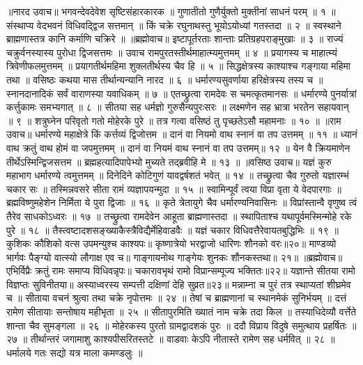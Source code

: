 ॥नारद उवाच॥
भगवन्देवदेवेश सृष्टिसंहारकारक ॥
गुणातीतो गुणैर्युक्तो मुक्तीनां साधनं परम् ॥ १ ॥
संस्थाप्य वेदभवनं विधिवद्द्विज सत्तमान् ॥
किं चक्रे रघुनाथस्तु भूयोऽयोध्यां गतस्तदा ॥ २ ॥
स्वस्थाने ब्राह्मणास्तत्र कानि कर्माणि चक्रिरे ॥
॥ब्रह्मोवाच॥
इष्टापूर्तरताः शान्ताः प्रतिग्रहपराङ्मुखाः ॥ ३ ॥
राज्यं चक्रुर्वनस्यास्य पुरोधा द्विजसत्तमः ॥
उवाच रामपुरतस्तीर्थमाहात्म्यमुत्तमम् ॥ ४ ॥
प्रयागस्य च माहात्म्यं त्रिवेणीफलमुत्तमम् ॥
प्रयागतीर्थमहिमा शुक्लतीर्थस्य चैव हि ॥ ५ ॥
सिद्धक्षेत्रस्य काश्याश्च गङ्गाया महिमा तथा ॥
वसिष्ठः कथया मास तीर्थान्यन्यानि नारद ॥ ६ ॥
धर्मारण्यसुवर्णाया हरिक्षेत्रस्य तस्य च ॥
स्नानदानादिकं सर्वं वाराणस्या यवाधिकम् ॥ ७ ॥
एतच्छ्रुत्वा रामदेवः स चमत्कृतमानसः ॥
धर्मारण्ये पुनर्यात्रां कर्त्तुकामः समभ्यगात् ॥ ८ ॥
सीतया सह धर्मज्ञो गुरुसैन्यपुरःसरः ॥
लक्ष्मणेन सह भ्रात्रा भरतेन सहायवान् ॥ ९ ॥
शत्रुघ्नेन परिवृतो गतो मोहेरके पुरे ॥
तत्र गत्वा वसिष्ठं तु पृच्छतेऽसौ महामनाः ॥ १० ॥
॥राम उवाच॥
धर्मारण्ये महाक्षेत्रे किं कर्त्तव्यं द्विजोत्तम ॥
दानं वा नियमो वाथ स्नानं वा तप उत्तमम् ॥ ११ ॥
ध्यानं वाथ क्रतुं वाथ होमं वा जपमुत्तमम् ॥
दानं वा नियमं वाथ स्नानं वा तप उत्तमम्॥ १२ ॥
येन वै क्रियमाणेन तीर्थेऽस्मिन्द्विजसत्तम ॥
ब्रह्महत्यादिपापेभ्यो मुच्यते तद्ब्रवीहि मे ॥ १३ ॥
॥वसिष्ठ उवाच॥
यज्ञं कुरु महाभाग धर्मारण्ये त्वमुत्तमम् ॥
दिनेदिने कोटिगुणं यावद्वर्षशतं भवेत् ॥ १४ ॥
तच्छ्रुत्वा चैव गुरुतो यज्ञारम्भं चकार सः ॥
तस्मिन्नवसरे सीता रामं व्यज्ञापयन्मुदा ॥ १५ ॥
स्वामिन्पूर्वं त्वया विप्रा वृता ये वेदपारगाः ॥
ब्रह्मविष्णुमहेशेन निर्मिता ये पुरा द्विजाः ॥ १६ ॥
कृते त्रेतायुगे चैव धर्मारण्यनिवासिनः ॥
विप्रांस्तान्वै वृणुष्व त्वं तैरेव साधकोऽध्वरः ॥ १७ ॥
तच्छ्रुत्वा रामदेवेन आहूता ब्राह्मणास्तदा ॥
स्थापिताश्च यथापूर्वमस्मिन्मोहे रके पुरे ॥ १८ ॥
तैस्त्वष्टादशसङ्ख्याकैस्त्रैविद्यैर्मेहिवाडवैः ॥
यज्ञं चकार विधिवत्तैरेवायतबुद्धिभिः ॥ १९ ॥
कुशिकः कौशिको वत्स उपमन्युश्च काश्यपः॥
कृष्णात्रेयो भरद्वाजो धारिणः शौनको वरः॥२०॥
माण्डव्यो भार्गवः पैङ्ग्यो वात्स्यो लौगाक्ष एव च॥
गाङ्गायनोथ गाङ्गेयः शुनकः शौनकस्तथा॥ २१॥
॥ब्रह्मोवाच॥
एभिर्विप्रैः क्रतुं रामः समाप्य विधिवन्नृपः॥
चकारावभृथं रामो विप्रान्सम्पूज्य भक्तितः॥२२॥
यज्ञान्ते सीतया रामो विज्ञप्तः सुविनीतया॥
अस्याध्वरस्य सम्पत्ती दक्षिणां देहि सुव्रत॥२३॥
मन्नाम्ना च पुरं तत्र स्थाप्यतां शीघ्रमेव च ॥
सीताया वचनं श्रुत्वा तथा चक्रे नृपोत्तमः ॥ २४ ॥
तेषां च ब्राह्मणानां च स्थानमेकं सुनिर्भयम् ॥
दत्तं रामेण सीतायाः सन्तोषाय महीभृता ॥ २५ ॥
सीतापुरमिति ख्यातं नाम चक्रे तदा किल ॥
तस्याधिदेव्यौ वर्त्तेते शान्ता चैव सुमङ्गला ॥ २६ ॥
मोहेरकस्य पुरतो ग्रामद्वादशकं पुरः ॥
ददौ विप्राय विदुषे समुत्थाय प्रहर्षितः ॥ २७ ॥
तीर्थान्तरं जगामाशु काश्यपीसरितस्तटे ॥
वाडवाः केऽपि नीतास्ते रामेण सह धर्मवित् ॥ २८ ॥
धर्मालये गतः सद्यो यत्र माला कमण्डलुः ॥
